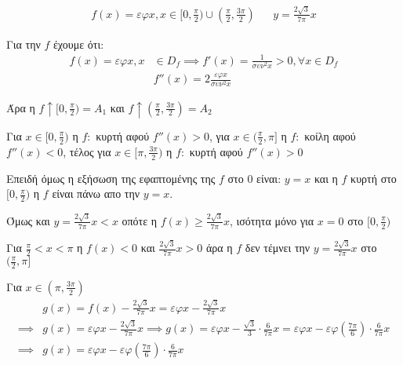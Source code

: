 \setcounter{equation}{0}
        
\question  

\begin{align*}
    f(x) = \varepsilon\varphi x,x\in[0,\frac{\pi}{2})\cup(\frac{\pi}{2}, \frac{3\pi}{2}) && y=\frac{2\sqrt{3}}{7\pi}x
\end{align*}
        
\begin{center}
\textgreek{Για την $f$ έχουμε ότι: }
\begin{align*}
    f(x) = \varepsilon\varphi x,x &\in D_f \implies f'(x) = \frac{1}{\sigma\upsilon\nu^2 x} > 0, \forall x\in D_f\\
    &f''(x) = 2\frac{\varepsilon\varphi x}{\sigma\upsilon\nu^2 x}
\end{align*}

\textgreek{Άρα η $f\uparrow[0,\frac{\pi}{2})=A_1$ και $f\uparrow(\frac{\pi}{2}, \frac{3\pi}{2})=A_2$}
\vspace{3mm}
      
\textgreek{Για $x\in[0,\frac{\pi}{2})$ η $f:$ κυρτή αφού $f''(x)>0$, για $x\in(\frac{\pi}{2}, \pi]$ η $f:$ κοίλη αφού $f''(x)<0$, τέλος για $x\in[\pi, \frac{3\pi}{2})$ η $f:$ κυρτή αφού $f''(x)>0$\\}
      
\vspace{3mm}
\textgreek{Επειδή όμως η εξήσωση της εφαπτομένης της $f$ στο 0 είναι: $y=x$ και η $f$ κυρτή στο $[0,\frac{\pi}{2})$ η $f$ είναι πάνω απο την $y=x$.}
\vspace{3mm}
      
\textgreek{Όμως και $y=\frac{2\sqrt{3}}{7\pi}x < x$ οπότε η $f(x)\geq\frac{2\sqrt{3}}{7\pi}x$, ισότητα μόνο για $x=0$ στο $[0,\frac{\pi}{2})$}
\vspace{3mm}
      
\textgreek{Για $\frac{\pi}{2} < x < \pi$ η $f(x) < 0$ και $\frac{2\sqrt{3}}{7\pi}x > 0$ άρα η $f$ δεν τέμνει την $y = \frac{2\sqrt{3}}{7\pi}x$ στο $(\frac{\pi}{2},\pi]$}
\vspace{3mm}
      
\textgreek{Για $x\in({\pi}, \frac{3\pi}{2})$}
\begin{align*}
    &g(x) = f(x) - \frac{2\sqrt{3}}{7\pi}x = \varepsilon\varphi x - \frac{2\sqrt{3}}{7\pi}x\\
    \implies &g(x) = \varepsilon\varphi x - \frac{2\sqrt{3}}{7\pi}x \implies g(x) = \varepsilon\varphi x -  \frac{\sqrt{3}}{3}\cdot \frac{6}{7\pi}x =  \varepsilon\varphi x - \varepsilon\varphi \left(\frac{7\pi}{6}\right)\cdot \frac{6}{7\pi}x\\
    \implies &g(x) = \varepsilon\varphi x - \varepsilon\varphi \left(\frac{7\pi}{6}\right)\cdot \frac{6}{7\pi}x
\end{align*}
      

\end{center}
